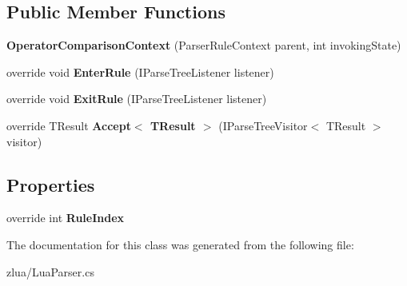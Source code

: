 \subsection*{Public Member Functions}
\begin{DoxyCompactItemize}
\item 
\mbox{\label{classzlua_1_1_lua_parser_1_1_operator_comparison_context_a18a4bc5fd58108325569bb9eef7227d0}} 
{\bfseries Operator\+Comparison\+Context} (Parser\+Rule\+Context parent, int invoking\+State)
\item 
\mbox{\label{classzlua_1_1_lua_parser_1_1_operator_comparison_context_ab1aa895dc61766bee70d7cb478f47b72}} 
override void {\bfseries Enter\+Rule} (I\+Parse\+Tree\+Listener listener)
\item 
\mbox{\label{classzlua_1_1_lua_parser_1_1_operator_comparison_context_a56427ab8797866426a5d7dae437c7a77}} 
override void {\bfseries Exit\+Rule} (I\+Parse\+Tree\+Listener listener)
\item 
\mbox{\label{classzlua_1_1_lua_parser_1_1_operator_comparison_context_a315333deb1eeef05a64a48af3b0a4885}} 
override T\+Result {\bfseries Accept$<$ T\+Result $>$} (I\+Parse\+Tree\+Visitor$<$ T\+Result $>$ visitor)
\end{DoxyCompactItemize}
\subsection*{Properties}
\begin{DoxyCompactItemize}
\item 
\mbox{\label{classzlua_1_1_lua_parser_1_1_operator_comparison_context_a9394115763910e8dc27c175c1bf901de}} 
override int {\bfseries Rule\+Index}
\end{DoxyCompactItemize}


The documentation for this class was generated from the following file\+:\begin{DoxyCompactItemize}
\item 
zlua/Lua\+Parser.\+cs\end{DoxyCompactItemize}
